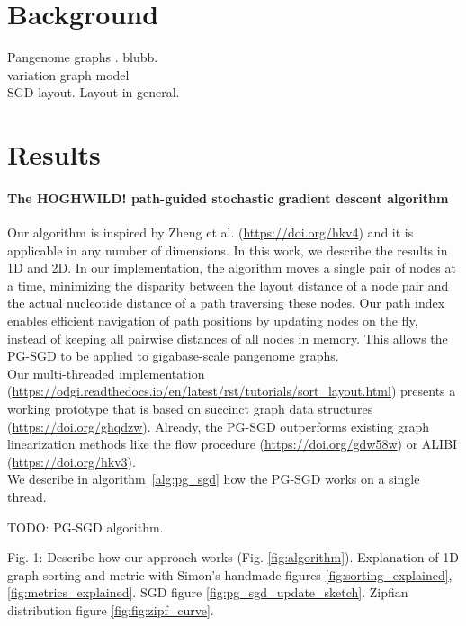 \documentclass[11pt,hidelinks]{article}
\begin{document}
\section{Background}

Pangenome graphs \cite{computational2016computational}. blubb.
\\
variation graph model
\\
SGD-layout. Layout in general.
\\

\section{Results}

\paragraph{The HOGHWILD! path-guided stochastic gradient descent algorithm}
Our algorithm is inspired by Zheng et al. (\url{https://doi.org/hkv4}) and it is applicable in any number of dimensions.
In this work, we describe the results in 1D and 2D.
In our implementation, the algorithm moves a single pair of nodes at a time, minimizing the disparity between the layout distance of a node pair and the actual nucleotide distance of a path traversing these nodes.
Our path index enables efficient navigation of path positions by updating nodes on the fly, instead of keeping all pairwise distances of all nodes in memory.
This allows the PG-SGD to be applied to gigabase-scale pangenome graphs. \\
Our multi-threaded implementation (\url{https://odgi.readthedocs.io/en/latest/rst/tutorials/sort_layout.html}) presents a working prototype that is based on succinct graph data structures (\url{https://doi.org/ghqdzw}).
Already, the PG-SGD outperforms existing graph linearization methods like the flow procedure (\url{https://doi.org/gdw58w}) or ALIBI (\url{https://doi.org/hkv3}).
\\
We describe in algorithm~\ref{alg:pg_sgd} how the PG-SGD works on a single thread.
\begin{algorithm}
	\caption{TODO: PG-SGD algorithm.}
	\label{alg:pg_sgd}
\end{algorithm}

Fig. 1: Describe how our approach works (Fig. \ref{fig:algorithm}). Explanation of 1D graph sorting and metric with Simon's handmade figures \ref{fig:sorting_explained},\ref{fig:metrics_explained}. SGD figure \ref{fig:pg_sgd_update_sketch}. Zipfian distribution figure \ref{fig:fig:zipf_curve}.
\end{document}
